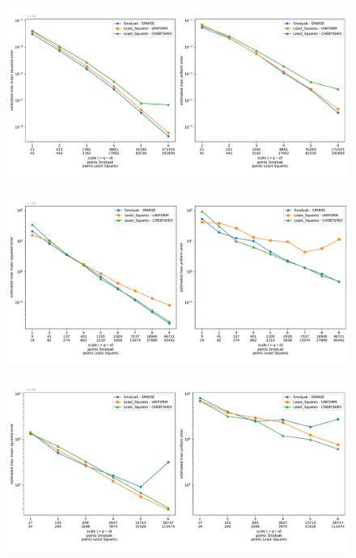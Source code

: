 \documentclass[12pt, oneside]{amsart}
\theoremstyle{definition}
\theoremstyle{remark}
\numberwithin{equation}{section}
\begin{document}
\begin{figure}[h]
	\centering
	\includegraphics[width=\linewidth]{figures/morokoff_calfisch2/dim10/max_error_distribution_fixed_dim}
	\caption{}
	\label{fig:morokoff_calfisch2_dim10}
\end{figure}


\begin{figure}[h]
	\centering
	\includegraphics[width=\linewidth]{figures/roos_arnold/dim4/max_error_distribution_fixed_dim}
	\caption{}
	\label{fig:roos_arnold_dim4}
\end{figure}

\begin{figure}[h]
	\centering
	\includegraphics[width=\linewidth]{figures/roos_arnold/dim8/max_error_distribution_fixed_dim}
	\caption{}
	\label{fig:roos_arnold_dim8}
\end{figure}
\end{document}

